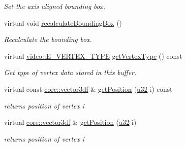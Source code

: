 \begin{DoxyCompactItemize}
\begin{DoxyCompactList}\small\item\em Set the axis aligned bounding box. \end{DoxyCompactList}\item 
virtual void \hyperlink{classirr_1_1scene_1_1CMeshBuffer_aad55263eaf019b090c8d1c3c5f7f4407}{recalculate\+Bounding\+Box} ()
\begin{DoxyCompactList}\small\item\em Recalculate the bounding box. \end{DoxyCompactList}\item 
virtual \hyperlink{namespaceirr_1_1video_a0e3b59e025e0d0db0ed2ee0ce904deac}{video\+::\+E\+\_\+\+V\+E\+R\+T\+E\+X\+\_\+\+T\+Y\+PE} \hyperlink{classirr_1_1scene_1_1CMeshBuffer_a341db661218a49d8d8fd12550700cb67}{get\+Vertex\+Type} () const
\begin{DoxyCompactList}\small\item\em Get type of vertex data stored in this buffer. \end{DoxyCompactList}\item 
\mbox{\label{classirr_1_1scene_1_1CMeshBuffer_a4a94e12e5b3f07a795695693ed9ef18d}} 
virtual const \hyperlink{namespaceirr_1_1core_ae6e2b2a6c552833ebbd5b7463d03586b}{core\+::vector3df} \& \hyperlink{classirr_1_1scene_1_1CMeshBuffer_a4a94e12e5b3f07a795695693ed9ef18d}{get\+Position} (\hyperlink{namespaceirr_a0416a53257075833e7002efd0a18e804}{u32} i) const
\begin{DoxyCompactList}\small\item\em returns position of vertex i \end{DoxyCompactList}\item 
\mbox{\label{classirr_1_1scene_1_1CMeshBuffer_a70890de5d1014a4bf1b1f9e7819f8e9b}} 
virtual \hyperlink{namespaceirr_1_1core_ae6e2b2a6c552833ebbd5b7463d03586b}{core\+::vector3df} \& \hyperlink{classirr_1_1scene_1_1CMeshBuffer_a70890de5d1014a4bf1b1f9e7819f8e9b}{get\+Position} (\hyperlink{namespaceirr_a0416a53257075833e7002efd0a18e804}{u32} i)
\begin{DoxyCompactList}\small\item\em returns position of vertex i \end{DoxyCompactList}\item 
\mbox{\label{classirr_1_1scene_1_1CMeshBuffer_ac93c92c49e801141cab699484bcf818d}} 

\end{DoxyCompactItemize}
